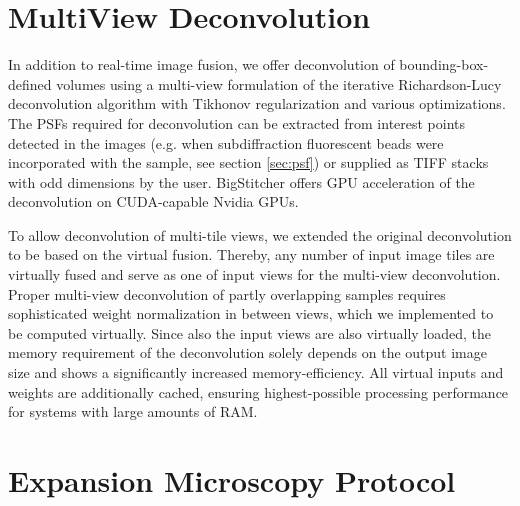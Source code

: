 \section{MultiView Deconvolution}

In addition to real-time image fusion, we offer deconvolution of bounding-box-defined volumes using a multi-view formulation of the iterative Richardson-Lucy deconvolution algorithm\cite{richardson, lucy} with Tikhonov regularization\cite{Tikhonov/Arsenin/77} and various optimizations\cite{mvdecon}. The PSFs required for deconvolution can be extracted from interest points detected in the images (e.g. when subdiffraction fluorescent beads were incorporated with the sample, see section \ref{sec:psf}) or supplied as TIFF stacks with odd dimensions by the user. BigStitcher offers GPU acceleration of the deconvolution on CUDA-capable Nvidia GPUs.

To allow deconvolution of multi-tile views, we extended the original deconvolution\cite{mvdecon} to be based on the virtual fusion. Thereby, any number of input image tiles are virtually fused and serve as one of input views for the multi-view deconvolution. Proper multi-view deconvolution of partly overlapping samples requires sophisticated weight normalization in between views\cite{mvdecon}, which we implemented to be computed virtually. Since also the input views are also virtually loaded, the memory requirement of the deconvolution solely depends on the output image size and shows a significantly increased memory-efficiency. All virtual inputs and weights are additionally cached, ensuring highest-possible processing performance for systems with large amounts of RAM.

\section{Expansion Microscopy Protocol}
\label{sec:expansion}

